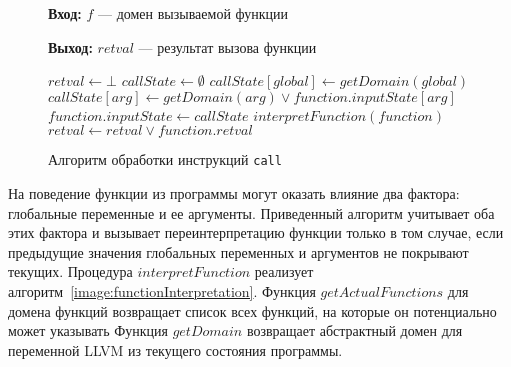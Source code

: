 \begin{figure}[h!]
\textbf{Вход:} $f$ --- домен вызываемой функции

\textbf{Выход:} $retval$ --- результат вызова функции

\begin{algorithmic}[1]
\State $retval \gets \bot$
    \State $callState \gets \emptyset$
        \State $callState[global] \gets getDomain(global)$
    \EndFor
        \State $callState[arg] \gets getDomain(arg) \vee
        function.inputState[arg]$
    \EndFor
        \State $function.inputState \gets callState$
        \State $interpretFunction(function)$
        \State $retval \gets retval \vee function.retval$
    \EndIf
\EndFor
\end{algorithmic}
\caption{Алгоритм обработки инструкций \texttt{call}}
\label{image:callArg}
\end{figure}

На поведение функции из программы могут оказать влияние два фактора: 
глобальные переменные и ее аргументы. Приведенный алгоритм учитывает оба этих 
фактора и вызывает переинтерпретацию функции только в том случае, если 
предыдущие значения глобальных переменных и аргументов не покрывают текущих. 
Процедура $interpretFunction$ реализует 
алгоритм~\ref{image:functionInterpretation}. Функция $getActualFunctions$ для 
домена функций возвращает список всех функций, на которые он потенциально 
может указывать Функция $getDomain$ возвращает абстрактный домен для 
переменной LLVM из текущего состояния программы.

